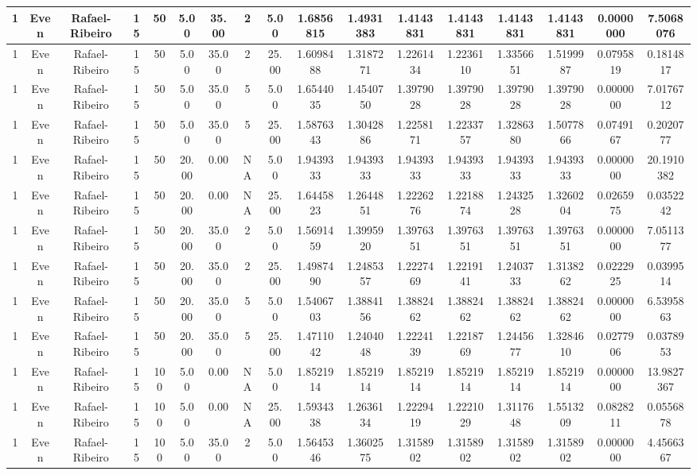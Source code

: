 \begin{longtable}{ | c | c | c | c | c | c | c | c | c | c | c | c | c | c | c | c | c | }
	\hline
	1	&	Even	&	Rafael-Ribeiro	&	15	&	50	&	5.00	&	35.00	&	2	&	5.00	&	1.6856815	&	1.4931383	&	1.4143831	&	1.4143831	&	1.4143831	&	1.4143831	&	0.0000000	&	7.5068076 \\
	\hline
	1	&	Even	&	Rafael-Ribeiro	&	15	&	50	&	5.00	&	35.00	&	2	&	25.00	&	1.6098488	&	1.3187271	&	1.2261434	&	1.2236110	&	1.3356651	&	1.5199987	&	0.0795819	&	0.1814817 \\
	\hline
	1	&	Even	&	Rafael-Ribeiro	&	15	&	50	&	5.00	&	35.00	&	5	&	5.00	&	1.6544035	&	1.4540750	&	1.3979028	&	1.3979028	&	1.3979028	&	1.3979028	&	0.0000000	&	7.0176712 \\
	\hline
	1	&	Even	&	Rafael-Ribeiro	&	15	&	50	&	5.00	&	35.00	&	5	&	25.00	&	1.5876343	&	1.3042886	&	1.2258171	&	1.2233757	&	1.3286380	&	1.5077866	&	0.0749167	&	0.2020777 \\
	\hline
	1	&	Even	&	Rafael-Ribeiro	&	15	&	50	&	20.00	&	0.00	&	NA	&	5.00	&	1.9439333	&	1.9439333	&	1.9439333	&	1.9439333	&	1.9439333	&	1.9439333	&	0.0000000	&	20.1910382 \\
	\hline
	1	&	Even	&	Rafael-Ribeiro	&	15	&	50	&	20.00	&	0.00	&	NA	&	25.00	&	1.6445823	&	1.2644851	&	1.2226276	&	1.2218874	&	1.2432528	&	1.3260204	&	0.0265975	&	0.0352242 \\
	\hline
	1	&	Even	&	Rafael-Ribeiro	&	15	&	50	&	20.00	&	35.00	&	2	&	5.00	&	1.5691459	&	1.3995920	&	1.3976351	&	1.3976351	&	1.3976351	&	1.3976351	&	0.0000000	&	7.0511377 \\
	\hline
	1	&	Even	&	Rafael-Ribeiro	&	15	&	50	&	20.00	&	35.00	&	2	&	25.00	&	1.4987490	&	1.2485357	&	1.2227469	&	1.2219141	&	1.2403733	&	1.3138262	&	0.0222925	&	0.0399514 \\
	\hline
	1	&	Even	&	Rafael-Ribeiro	&	15	&	50	&	20.00	&	35.00	&	5	&	5.00	&	1.5406703	&	1.3884156	&	1.3882462	&	1.3882462	&	1.3882462	&	1.3882462	&	0.0000000	&	6.5395863 \\
	\hline
	1	&	Even	&	Rafael-Ribeiro	&	15	&	50	&	20.00	&	35.00	&	5	&	25.00	&	1.4711042	&	1.2404048	&	1.2224139	&	1.2218769	&	1.2445677	&	1.3284610	&	0.0277906	&	0.0378953 \\
	\hline
	1	&	Even	&	Rafael-Ribeiro	&	15	&	100	&	5.00	&	0.00	&	NA	&	5.00	&	1.8521914	&	1.8521914	&	1.8521914	&	1.8521914	&	1.8521914	&	1.8521914	&	0.0000000	&	13.9827367 \\
	\hline
	1	&	Even	&	Rafael-Ribeiro	&	15	&	100	&	5.00	&	0.00	&	NA	&	25.00	&	1.5934338	&	1.2636134	&	1.2229419	&	1.2221029	&	1.3117648	&	1.5513209	&	0.0828211	&	0.0556878 \\
	\hline
	1	&	Even	&	Rafael-Ribeiro	&	15	&	100	&	5.00	&	35.00	&	2	&	5.00	&	1.5645346	&	1.3602575	&	1.3158902	&	1.3158902	&	1.3158902	&	1.3158902	&	0.0000000	&	4.4566367 \\

\end{longtable}
